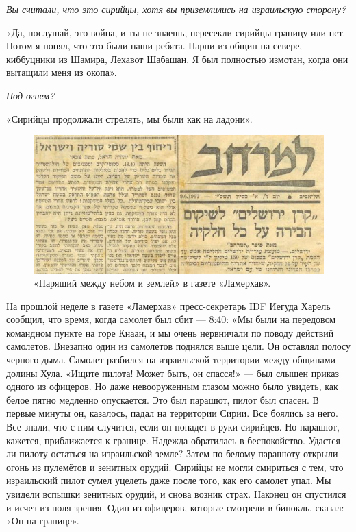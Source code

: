 \textit{Вы считали, что это сирийцы, хотя вы приземлились на израильскую сторону?}

«Да, послушай, это война, и ты не знаешь, пересекли сирийцы границу или нет. Потом я понял, что это были наши ребята. Парни из общин на севере, киббуцники из Шамира, Лехавот Шабашан. Я был полностью измотан, когда они вытащили меня из окопа».

\textit{Под огнем?}

«Сирийцы продолжали стрелять, мы были как на ладони». 

\begin{figure}[h!tb] 
	\centering\includegraphics[scale=0.6]{History_BenNun/ODbl5G862D4.jpg}
	\caption{«Парящий между небом и землей» в газете «Ламерхав». }%
\end{figure}

На прошлой неделе в газете «Ламерхав» пресс-секретарь IDF Иегуда Харель сообщил, что время, когда самолет был сбит — 8:40: «Мы были на передовом командном пункте на горе Кнаан, и мы очень нервничали по поводу действий самолетов. Внезапно один из самолетов поднялся выше цели. Он оставлял полосу черного дыма. Самолет разбился на израильской территории между общинами долины Хула. «Ищите пилота! Может быть, он спасся!» — был слышен приказ одного из офицеров. Но даже невооруженным глазом можно было увидеть, как белое пятно медленно опускается. Это был парашют, пилот был спасен. В первые минуты он, казалось, падал на территории Сирии. Все боялись за него. Все знали, что с ним случится, если он попадет в руки сирийцев. Но парашют, кажется, приближается к границе. Надежда обратилась в беспокойство. Удастся ли пилоту остаться на израильской земле? Затем по белому парашюту открыли огонь из пулемётов и зенитных орудий. Сирийцы не могли смириться с тем, что израильский пилот сумел уцелеть даже после того, как его самолет упал. Мы увидели вспышки зенитных орудий, и снова возник страх. Наконец он спустился и исчез из поля зрения. Один из офицеров, которые смотрели в бинокль, сказал: «Он на границе».

